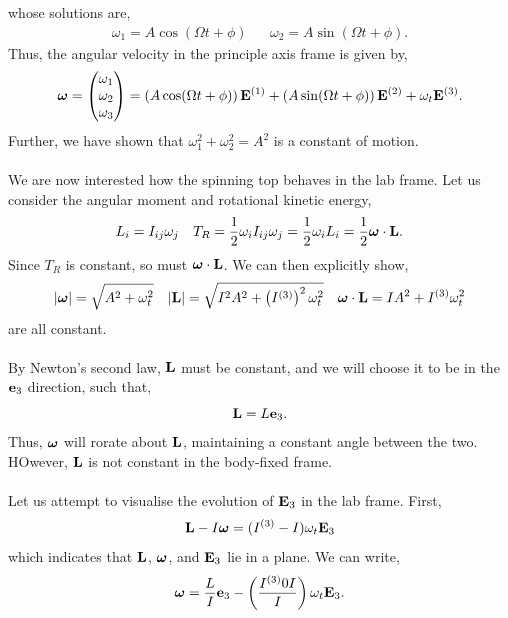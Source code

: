 \documentclass{book}
\begin{document}
whose solutions are,
\begin{align}
    \omega_1 = A\cos{(\Omega t + \phi)} && \omega_2 = A\sin{(\Omega t + \phi)}.
\end{align}
Thus, the angular velocity in the principle axis frame is given by,
\begin{equation}
    \vb*{\omega} = \begin{pmatrix}
        \omega_1 \\ \omega_2 \\ \omega_3
    \end{pmatrix} = \left(A\cos(\Omega t + \phi)\right)\vb{E}^{(1)} + \left(A\sin(\Omega t + \phi)\right)\vb{E}^{(2)} + \omega_t\vb{E}^{(3)}.
\end{equation}
Further, we have shown that $\omega_1^2 + \omega_2^2 = A^2$ is a constant of motion.
\\\\
We are now interested how the spinning top behaves in the lab frame.  Let us consider the angular moment and rotational kinetic energy,
\begin{align}
	L_i = I_{ij}\omega_j && T_R = \frac{1}{2}\omega_i I_{ij}\omega_j = \frac{1}{2} \omega_iL_i = \frac{1}{2}\vb*{\omega}\cdot\vb{L}.
\end{align}
Since $T_R$ is constant, so must $\vb*{\omega}\cdot\vb{L}$. We can then explicitly show,
\begin{align}
	|\vb*{\omega}| = \sqrt{A^2 + \omega_t^2} && |\vb{L}|=\sqrt{I^2A^2 + \left(I^{(3)}\right)^2 \omega_t^2} && \vb*{\omega}\cdot\vb{L}=IA^2 + I^{(3)} \omega_t^2
\end{align}
are all constant.\\\\
By Newton's second law, $\vb{L}$ must be constant, and we will choose it to be in the $\vb{e}_3$ direction, such that,
\begin{equation}
	\vb{L} = L\vb{e}_3.
\end{equation}
Thus, $\vb*{\omega}$ will rorate about $\vb{L}$, maintaining a constant angle between the two. HOwever, $\vb{L}$ is not constant in the body-fixed frame.
\\\\
Let us attempt to visualise the evolution of $\vb{E}_3$ in the lab frame. First,
\begin{equation}
	\vb{L} - I\vb*{\omega} = (I^{(3)} - I)\omega_t\vb{E}_3
\end{equation}
which indicates that $\vb{L}$, $\vb*{\omega}$, and $\vb{E}_3$ lie in a plane. We can write,
\begin{equation}
	\vb*{\omega} = \frac{L}{I}\vb{e}_3 - \left(\frac{I^{(3)} 0 I}{I}\right)\omega_t \vb{E}_3.
\end{equation}
\end{document}
